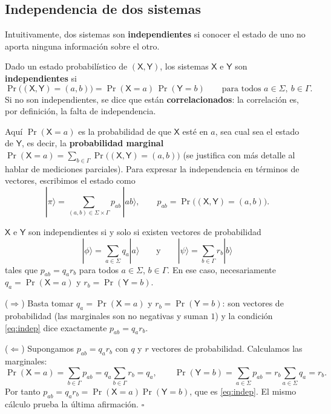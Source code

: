 \documentclass[11pt, a4paper, twoside, openright]{report}
\begin{document}
\subsection{Independencia de dos sistemas}

\noindent Intuitivamente, dos sistemas son \textbf{independientes} si conocer el estado de uno no aporta ninguna información sobre el otro.

\begin{tcolorbox}[colback=teal!5!white,colframe=teal!75!black,title=\textbf{Definición: Independencia y correlación}]
Dado un estado probabilístico de $(\mathsf{X}, \mathsf{Y})$, los sistemas $\mathsf{X}$ e $\mathsf{Y}$ son \textbf{independientes} si
\begin{equation}\label{eq:indep}
\Pr\big((\mathsf{X}, \mathsf{Y}) = (a, b)\big) = \Pr(\mathsf{X} = a)\,\Pr(\mathsf{Y} = b) \qquad \text{para todos } a \in \Sigma,\ b \in \Gamma.
\end{equation}
Si no son independientes, se dice que están \textbf{correlacionados}: la correlación es, por definición, la falta de independencia.
\end{tcolorbox}

\noindent Aquí $\Pr(\mathsf{X} = a)$ es la probabilidad de que $\mathsf{X}$ esté en $a$, sea cual sea el estado de $\mathsf{Y}$, es decir, la \textbf{probabilidad marginal} $\Pr(\mathsf{X}=a) = \sum_{b \in \Gamma} \Pr\big((\mathsf{X},\mathsf{Y}) = (a,b)\big)$ (se justifica con más detalle al hablar de mediciones parciales). Para expresar la independencia en términos de vectores, escribimos el estado como
\[ |\pi\rangle = \sum_{(a,b) \in \Sigma \times \Gamma} p_{ab}\, |ab\rangle, \qquad p_{ab} = \Pr\big((\mathsf{X},\mathsf{Y}) = (a,b)\big). \]

\begin{tcolorbox}[colback=teal!5!white,colframe=teal!75!black,title=\textbf{Proposición: Independencia en términos de vectores}]
$\mathsf{X}$ e $\mathsf{Y}$ son independientes si y solo si existen vectores de probabilidad
\[ |\phi\rangle = \sum_{a \in \Sigma} q_a |a\rangle \qquad \text{y} \qquad |\psi\rangle = \sum_{b \in \Gamma} r_b |b\rangle \]
tales que $p_{ab} = q_a r_b$ para todos $a \in \Sigma$, $b \in \Gamma$. En ese caso, necesariamente $q_a = \Pr(\mathsf{X} = a)$ y $r_b = \Pr(\mathsf{Y} = b)$.
\end{tcolorbox}

\begin{tcolorbox}[colback=gray!5!white,colframe=gray!75!black,title=\textbf{Demostración}]
($\Rightarrow$) Basta tomar $q_a = \Pr(\mathsf{X}=a)$ y $r_b = \Pr(\mathsf{Y}=b)$: son vectores de probabilidad (las marginales son no negativas y suman $1$) y la condición \eqref{eq:indep} dice exactamente $p_{ab} = q_a r_b$.

($\Leftarrow$) Supongamos $p_{ab} = q_a r_b$ con $q$ y $r$ vectores de probabilidad. Calculamos las marginales:
\[ \Pr(\mathsf{X}=a) = \sum_{b \in \Gamma} p_{ab} = q_a \sum_{b \in \Gamma} r_b = q_a, \qquad \Pr(\mathsf{Y}=b) = \sum_{a \in \Sigma} p_{ab} = r_b \sum_{a \in \Sigma} q_a = r_b. \]
Por tanto $p_{ab} = q_a r_b = \Pr(\mathsf{X}=a)\Pr(\mathsf{Y}=b)$, que es \eqref{eq:indep}. El mismo cálculo prueba la última afirmación. \hfill $\square$
\end{tcolorbox}
\end{document}
